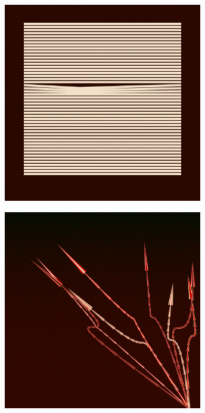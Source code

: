 \documentclass[11pt,twoside]{book}
\begin{document}
\begin{figure}[!ht]
\includegraphics[width=246pt]{constructivist-075b714d-45c4-4957-b227-e424e7ef4a36.png}
\end{figure}
\newpage
{}
\fancyfoot[CE,CO]{\fontsize{10}{12}\selectfont \thepage}
\begin{figure}[!ht]
\includegraphics[width=246pt]{constructivist-f4a93ec0-b037-4a84-aa80-23efa55a14b7.png}
\end{figure}
\newpage
{}
\fancyfoot[CE,CO]{\fontsize{10}{12}\selectfont \thepage}
\end{document}
